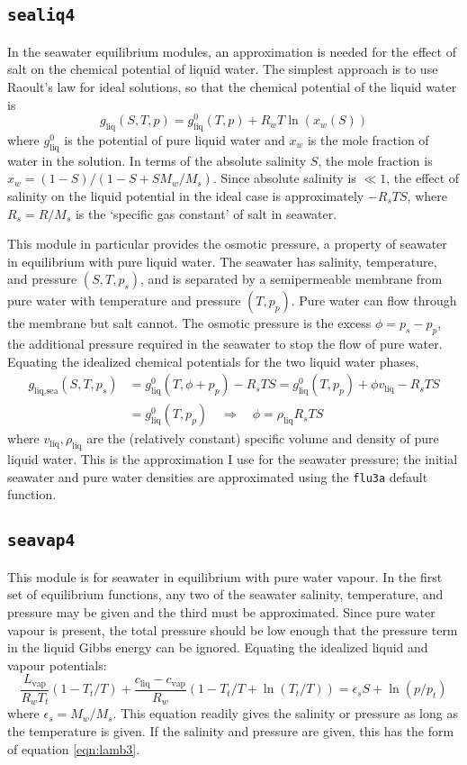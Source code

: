 \documentclass{article}
\newcommand{\liq}{\text{liq}}
\newcommand{\vap}{\text{vap}}
\newcommand{\sea}{\text{sea}}
\newcommand{\epss}{\epsilon_s}
\begin{document}
\subsection{\texttt{sealiq4}}

In the seawater equilibrium modules, an approximation is needed for the effect of salt on the chemical potential of liquid water. The simplest approach is to use Raoult's law for ideal solutions, so that the chemical potential of the liquid water is
\begin{equation*}
    g_{\liq}(S,T,p) = g^0_{\liq}(T,p) + R_w T \ln(x_w(S))
\end{equation*}
where $g^0_{\liq}$ is the potential of pure liquid water and $x_w$ is the mole fraction of water in the solution. In terms of the absolute salinity $S$, the mole fraction is $x_w = (1-S)/(1-S + S M_w/M_s)$. Since absolute salinity is $\ll 1$, the effect of salinity on the liquid potential in the ideal case is approximately $-R_s T S$, where $R_s = R/M_s$ is the `specific gas constant' of salt in seawater.

This module in particular provides the osmotic pressure, a property of seawater in equilibrium with pure liquid water. The seawater has salinity, temperature, and pressure $(S,T,p_s)$, and is separated by a semipermeable membrane from pure water with temperature and pressure $(T,p_p)$. Pure water can flow through the membrane but salt cannot. The osmotic pressure is the excess $\phi = p_s-p_p$, the additional pressure required in the seawater to stop the flow of pure water. Equating the idealized chemical potentials for the two liquid water phases,
\begin{align*}
    g_{\liq,\sea}(S,T,p_s) &= g^0_{\liq}(T,\phi+p_p) - R_s T S = g^0_{\liq}(T,p_p) + \phi v_{\liq} - R_s T S \\
    &= g^0_{\liq}(T,p_p) \quad \Rightarrow \quad \phi = \rho_{\liq} R_s T S
\end{align*}
where $v_{\liq}, \rho_{\liq}$ are the (relatively constant) specific volume and density of pure liquid water. This is the approximation I use for the seawater pressure; the initial seawater and pure water densities are approximated using the \texttt{flu3a} default function.


\subsection{\texttt{seavap4}}

This module is for seawater in equilibrium with pure water vapour. In the first set of equilibrium functions, any two of the seawater salinity, temperature, and pressure may be given and the third must be approximated. Since pure water vapour is present, the total pressure should be low enough that the pressure term in the liquid Gibbs energy can be ignored. Equating the idealized liquid and vapour potentials:
\begin{equation*}
    \frac{L_{\vap}}{R_w T_t} (1 - T_t/T) + \frac{c_{\liq}-c_{\vap}}{R_w} (1 - T_t/T + \ln(T_t/T)) = \epss S + \ln(p/p_t)
\end{equation*}
where $\epss = M_w/M_s$. This equation readily gives the salinity or pressure as long as the temperature is given. If the salinity and pressure are given, this has the form of equation \ref{eqn:lamb3}.
\end{document}
